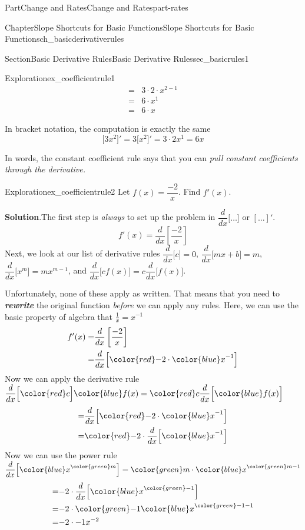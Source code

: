 \documentclass[oneside,10pt,]{tufte-book}
\newcommand{\blocktitlefont}{\relax}
\newcommand{\alert}[1]{\textbf{\textit{#1}}}
\numberwithin{equation}{chapter}
\newcommand{\red}[1]{   {\color{red}   #1}   }
\newcommand{\blue}[1]{  {\color{blue}  #1}  }
\newcommand{\green}[1]{ {\color{green} #1} }
\newcommand{\ddx}[1]{ \dfrac{d}{dx} \Big[ #1 \Big]  }
\newcommand{\ddxfrac}[1]{ \dfrac{d}{dx} \left[ #1 \right]  }
\newcommand{\D}[1]{ \Big[ #1 \Big]'  }
\newcommand{\amp}{&}
\begin{document}
\begin{partptx}{Part}{Change and Rates}{}{Change and Rates}{}{}{part-rates}
\begin{chapterptx}{Chapter}{Slope Shortcuts for Basic Functions}{}{Slope Shortcuts for Basic Functions}{}{}{ch_basicderivativerules}
\begin{sectionptx}{Section}{Basic Derivative Rules}{}{Basic Derivative Rules}{}{}{sec_basicrules1}
\begin{exploration}{Exploration}{}{ex_coefficientrule1}
\begin{align*}
= \amp 3 \cdot 2\cdot x^{2-1}\\
= \amp 6\cdot x^{1}\\
= \amp 6\cdot x
\end{align*}
%
\par
In bracket notation, the computation is exactly the same%
\begin{equation*}
\D{3x^2} = 3\D{x^2} = 3\cdot 2 x^1 = 6x
\end{equation*}
%
\end{exploration}%
In words, the constant coefficient rule says that you can \emph{pull constant coefficients through the derivative.}%
\begin{exploration}{Exploration}{}{ex_coefficientrule2}%
Let \(f(x) = \dfrac{-2}{x}\). Find \(f'(x)\).%
\par\smallskip%
\noindent\textbf{\blocktitlefont Solution}.\hypertarget{ex_coefficientrule2-2}{}\quad{}The first step is \emph{always} to set up the problem in \(\ddx{\dots}\) or \([ \dots ]'\).%
\begin{equation*}
f'(x) = \ddxfrac{ \dfrac{-2}{x} }
\end{equation*}
Next, we look at our list of derivative rules \(\ddx{c}=0\), \(\ddx{mx+b}=m\), \(\ddx{x^m}=mx^{m-1}\), and \(\ddx{ cf(x)}=c\ddx{f(x)}\).%
\par
Unfortunately, none of these apply as written. That  means that you need to \alert{rewrite} the original function \emph{before} we can apply any rules. Here, we can use  the basic property of algebra that \(\frac{1}{x} = x^{-1}\)%
\begin{align*}
f'(x)  = \amp  \ddxfrac{ \dfrac{-2}{x} }\\
= \amp \ddx{ {\red -2} \cdot {\blue x^{-1} } }
\end{align*}
Now we can apply the derivative rule \(\ddx{ \red c} {\blue f(x) } = {\red c} \ddx{\blue f(x) }\)%
\begin{align*}
= \amp \ddx{ {\red -2} \cdot { \blue x^{-1} } }\\
= \amp {\red -2} \cdot \ddx{ {\blue x^{-1} } }
\end{align*}
Now we can use the power rule \(\ddx{ {\blue x}^{\green m} } = {\green m}\cdot {\blue x}^{{\green m}-1} \)%
\begin{align*}
= \amp { -2} \cdot \ddx{ {\blue x}^{\green -1}  }\\
= \amp { -2} \cdot {\green -1} { {\blue x}^{{\green -1} -1 }  }\\
= \amp { -2} \cdot { -1} { { x}^{-2 }  }\\

\end{align*}
\end{exploration}
\end{sectionptx}
\end{chapterptx}
\end{partptx}
\end{document}

